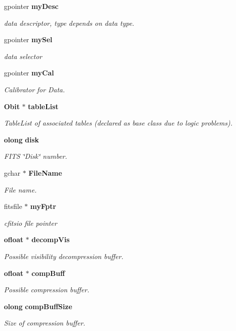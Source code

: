 \begin{CompactItemize}
gpointer {\bf my\-Desc}
\begin{CompactList}\small\item\em data descriptor, type depends on data type. \item\end{CompactList}\item 
gpointer {\bf my\-Sel}
\begin{CompactList}\small\item\em data selector \item\end{CompactList}\item 
gpointer {\bf my\-Cal}
\begin{CompactList}\small\item\em Calibrator for Data. \item\end{CompactList}\item 
{\bf Obit} $\ast$ {\bf table\-List}
\begin{CompactList}\small\item\em Table\-List of associated tables (declared as base class due to logic problems). \item\end{CompactList}\item 
{\bf olong} {\bf disk}
\begin{CompactList}\small\item\em FITS \char`\"{}Disk\char`\"{} number. \item\end{CompactList}\item 
gchar $\ast$ {\bf File\-Name}
\begin{CompactList}\small\item\em File name. \item\end{CompactList}\item 
fitsfile $\ast$ {\bf my\-Fptr}
\begin{CompactList}\small\item\em cfitsio file pointer \item\end{CompactList}\item 
{\bf ofloat} $\ast$ {\bf decomp\-Vis}
\begin{CompactList}\small\item\em Possible visibility decompression buffer. \item\end{CompactList}\item 
{\bf ofloat} $\ast$ {\bf comp\-Buff}
\begin{CompactList}\small\item\em Possible compression buffer. \item\end{CompactList}\item 
{\bf olong} {\bf comp\-Buff\-Size}
\begin{CompactList}\small\item\em Size of compression buffer. \item\end{CompactList}\end{CompactItemize}


